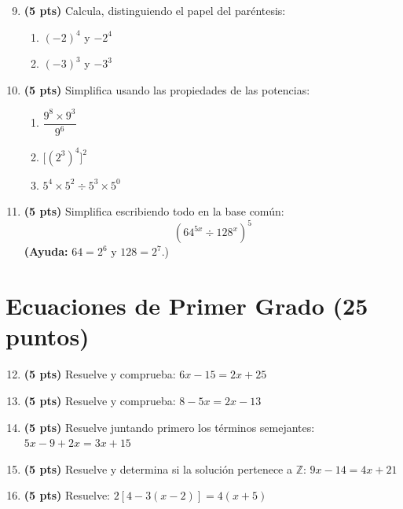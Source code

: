 \documentclass[12pt, letterpaper]{article}
\newcommand{\Z}{\mathbb{Z}}
\begin{document}
\begin{enumerate}[leftmargin=*]
  \setcounter{enumi}{8}
  \item \textbf{(5 pts)} Calcula, distinguiendo el papel del paréntesis:
        \begin{enumerate}[label=\alph*)]
          \item $(-2)^4$ \quad y \quad $-2^4$
          \item $(-3)^3$ \quad y \quad $-3^3$
        \end{enumerate}

  \item \textbf{(5 pts)} Simplifica usando las propiedades de las potencias:
        \begin{enumerate}[label=\alph*)]
          \item $\dfrac{9^8 \times 9^3}{9^6}$
          \item $\big[(2^3)^4\big]^2$
          \item $5^4 \times 5^2 \div 5^3 \times 5^0$
        \end{enumerate}

  \item \textbf{(5 pts)} Simplifica escribiendo todo en la base común:
        \[
          (64^{5x} \div 128^{x})^{5}
        \]
        \textbf{(Ayuda:} $64 = 2^6$ y $128 = 2^7$.)
\end{enumerate}

\section{Ecuaciones de Primer Grado (25 puntos)}

\begin{enumerate}[leftmargin=*]
  \setcounter{enumi}{11}
  \item \textbf{(5 pts)} Resuelve y comprueba: $6x - 15 = 2x + 25$

  \item \textbf{(5 pts)} Resuelve y comprueba: $8 - 5x = 2x - 13$

  \item \textbf{(5 pts)} Resuelve juntando primero los términos semejantes: $5x - 9 + 2x = 3x + 15$

  \item \textbf{(5 pts)} Resuelve y determina si la solución pertenece a $\Z$: $9x - 14 = 4x + 21$

  \item \textbf{(5 pts)} Resuelve: $2[4 - 3(x - 2)] = 4(x + 5)$
\end{enumerate}
\end{document}
